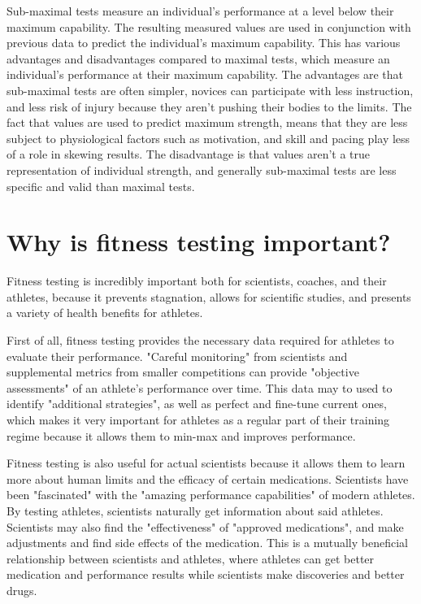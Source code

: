 \documentclass[12pt]{article}
\begin{document}
Sub-maximal tests measure an individual's performance at a level below their maximum capability. The resulting measured values are used in conjunction with previous data to predict the individual's maximum capability. This has various advantages and disadvantages compared to maximal tests, which measure an individual's performance at their maximum capability. The advantages are that sub-maximal tests are often simpler, novices can participate with less instruction, and less risk of injury because they aren't pushing their bodies to the limits. The fact that values are used to predict maximum strength, means that they are less subject to physiological factors such as motivation, and skill and pacing play less of a role in skewing results. The disadvantage is that values aren't a true representation of individual strength, and generally sub-maximal tests are less specific and valid than maximal tests.

\section*{Why is fitness testing important?}

Fitness testing is incredibly important both for scientists, coaches, and their athletes, because it prevents stagnation, allows for scientific studies, and presents a variety of health benefits for athletes.

First of all, fitness testing provides the necessary data required for athletes to evaluate their performance. "Careful monitoring" from scientists and supplemental metrics from smaller competitions can provide "objective assessments" of an athlete's performance over time. This data may to used to identify "additional strategies", as well as perfect and fine-tune current ones, which makes it very important for athletes as a regular part of their training regime because it allows them to min-max and improves performance.

Fitness testing is also useful for actual scientists because it allows them to learn more about human limits and the efficacy of certain medications. Scientists have been "fascinated" with the "amazing performance capabilities" of modern athletes. By testing athletes, scientists naturally get information about said athletes. Scientists may also find the "effectiveness" of "approved medications", and make adjustments and find side effects of the medication. This is a mutually beneficial relationship between scientists and athletes, where athletes can get better medication and performance results while scientists make discoveries and better drugs.
\end{document}
